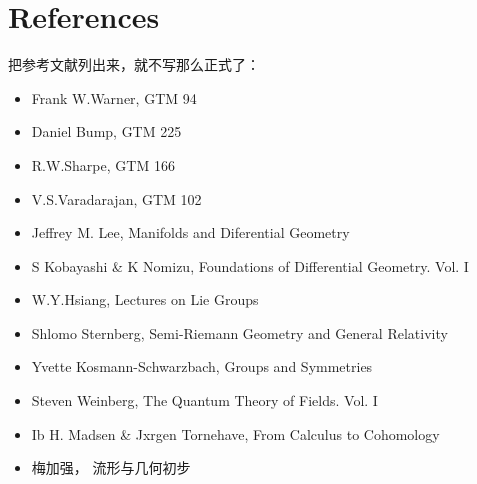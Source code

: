 \chapter*{References}
把参考文献列出来，就不写那么正式了：
\begin{itemize}

\item Frank W.Warner, GTM 94

\item Daniel Bump, GTM 225

\item R.W.Sharpe, GTM 166

\item V.S.Varadarajan, GTM 102

\item Jeffrey M. Lee, Manifolds and Diferential Geometry

\item S Kobayashi \& K Nomizu, Foundations of Differential Geometry. Vol. I

\item W.Y.Hsiang, Lectures on Lie Groups

\item Shlomo Sternberg, Semi-Riemann Geometry and General Relativity

\item Yvette Kosmann-Schwarzbach, Groups and Symmetries

\item Steven Weinberg, The Quantum Theory of Fields. Vol. I

\item Ib H. Madsen \& Jxrgen Tornehave, From Calculus to Cohomology

\item 梅加强， 流形与几何初步

\end{itemize}